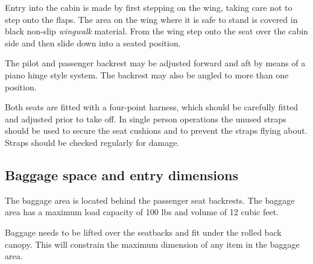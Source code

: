 Entry into the cabin is made by first stepping on the wing, taking care not to step onto the flaps.  The area on the wing where it is safe to stand is covered in black non-slip \textit{wingwalk} material.  From the wing step onto the seat over the cabin side and then slide down into a seated position.

The pilot and passenger backrest may be adjusted forward and aft by means of a piano hinge style system.  The backrest may also be angled to more than one position. 

Both seats are fitted with a four-point harness, which should be carefully fitted and adjusted prior to take off. In single person operations the unused straps should be used to secure the seat cushions and to prevent the straps flying about.
Straps should be checked regularly for damage.

\subsection{Baggage space and entry dimensions}
The baggage area is located behind the passenger seat backrests.  The baggage area has a maximum load capacity of 100 lbs and volume of 12 cubic feet.  

 Baggage needs to be lifted over the seatbacks and fit under the rolled back canopy.  This will constrain the maximum dimension of any item in the baggage area.

